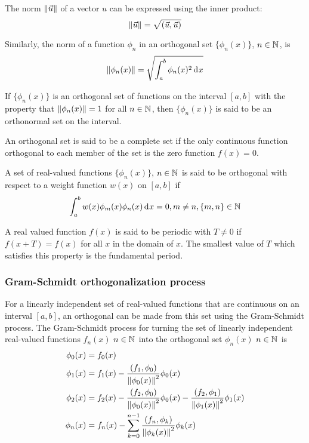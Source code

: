 \documentclass[10pt, twocolumn]{article}
\begin{document}
The norm \(\left\| \vec{u} \right\|\) of a vector \(u\) can be expressed using the inner product:
\[
  \left\| \vec{u} \right\| = \sqrt{\left( \vec{u}, \vec{u} \right)}
\]

Similarly, the norm of a function \(\phi_n\) in an orthogonal set \(\{\phi_n(x)\}\), \(n \in \mathbb{N}_{}^{}\), is
\[
  \left\| \phi_n(x) \right\| = \sqrt{\int_a^b{{\phi_n(x)^2} \,\mathrm{d}^{} x}}
\]

If \(\{\phi_n(x)\}\) is an orthogonal set of functions on the interval \([a,b]\) with the property that \(\left\| \phi_n(x) \right\| = 1\) for all \(n \in \mathbb{N}_{}^{}\), then \(\{\phi_n(x)\}\) is said to be an orthonormal set on the interval.

An orthogonal set is said to be a complete set if the only continuous function orthogonal to each member of the set is the zero function \(f(x) = 0\).

A set of real-valued functions \(\{\phi_n(x)\}\), \(n \in \mathbb{N}_{}^{}\) is said to be orthogonal with respect to a weight function \(w(x)\) on \([a,b]\) if
\[
  \int_a^b{w(x) \phi_m(x)\phi_n(x) \,\mathrm{d}^{} x} = 0, m \neq n, \{m,n\} \in \mathbb{N}_{}^{}
\]

A real valued function \(f(x)\) is said to be periodic with \(T \neq 0\) if \(f(x + T) = f(x)\) for all \(x\) in the domain of \(x\).
The smallest value of \(T\) which satisfies this property is the fundamental period.


\subsubsection{Gram-Schmidt orthogonalization process}
For a linearly independent set of real-valued functions that are continuous on an interval \([a,b]\), an orthogonal can be made from this set using the Gram-Schmidt process.
The Gram-Schmidt process for turning the set of linearly independent real-valued functions \({f_n(x)}\) \(n \in \mathbb{N}_{}^{}\) into the orthogonal set \({\phi_n(x)}\) \(n \in \mathbb{N}_{}^{}\) is
\begin{align*}
  \phi_0(x) & = f_0(x)                                                                                                       \\
  \phi_1(x) & = f_1(x) - \frac{(f_1,\phi_0)}{\left\| \phi_0(x) \right\|^2}\phi_0(x)                                                    \\
  \phi_2(x) & = f_2(x) - \frac{(f_2,\phi_0)}{\left\| \phi_0(x) \right\|^2}\phi_0(x) - \frac{(f_2,\phi_1)}{\left\| \phi_1(x) \right\|^2}\phi_1(x) \\
  \phi_n(x) & = f_n(x) - \sum_{k = 0}^{n - 1}{\frac{(f_n,\phi_k)}{\left\| \phi_k(x) \right\|^2}\phi_k(x)}                              \\
\end{align*}
\end{document}
